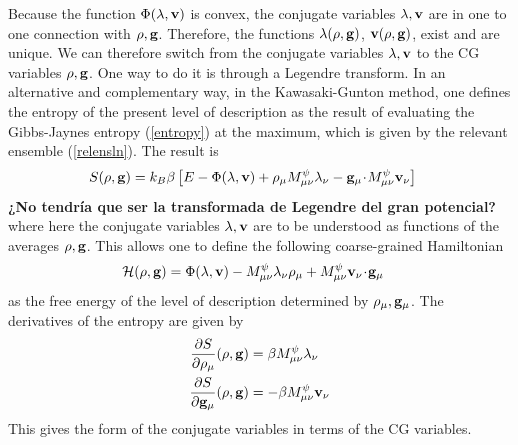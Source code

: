 \documentclass[b5paper,openright,11pt]{book}
\newcommand{\esc}{\!\cdot\!}
\newcommand{\Note}[1]{{\bf \color{red}#1}}    %
\begin{document}
\begin{appendices}
Because the function $ \Phi(\lambda,{\bf v})$ is convex, the conjugate
variables  $\lambda,{\bf  v}$  are  in  one  to  one  connection  with
$\rho,{\bf  g}$.  Therefore,  the  functions $\lambda(\rho,{\bf  g})$,
${\bf  v}(\rho,{\bf g})$,  exist  and are  unique.   We can  therefore
switch  from  the conjugate  variables  $\lambda,{\bf  v}$ to  the  CG
variables $\rho,{\bf  g}$.  One  way to  do it  is through  a Legendre
transform.   In   an  alternative   and  complementary  way,   in  the
Kawasaki-Gunton method, one  defines the entropy of  the present level
of description  as the result  of evaluating the  Gibbs-Jaynes entropy
(\ref{entropy}) at  the maximum, which  is given by  the relevant
ensemble (\ref{relensln}).  The result is
\begin{align}
  S(\rho,{\bf g}) &=k_B\beta\left[E-\Phi(\lambda,{\bf v})
+\rho_\mu M^\psi_{\mu\nu}\lambda_\nu-{\bf g}_\mu\esc M^\psi_{\mu\nu}{\bf v}_\nu\right]
\label{entropy2}
\end{align}
\Note{¿No tendría que ser la transformada de Legendre del gran potencial?}
where  here  the  conjugate  variables $\lambda,{\bf  v}$  are  to  be
understood as functions  of the averages $\rho,{\bf  g}$.  This allows one
to define  the following coarse-grained Hamiltonian
\begin{align}
  {\cal H}(\rho,{\bf g}) &=\Phi(\lambda,{\bf v})
 - M^\psi_{\mu\nu}\lambda_\nu \rho_\mu+M^\psi_{\mu\nu}{\bf v}_\nu\esc {\bf g}_\mu
\label{olegApp}
\end{align}
as  the  free  energy  of  the  level  of  description  determined  by
$\rho_\mu,{\bf g}_\mu$. The derivatives of the entropy are given by
\begin{align}
\frac{\partial S}{\partial \rho_\mu} (\rho,{\bf g}) &=\beta M^\psi_{\mu\nu}\lambda_\nu
\nonumber\\
\frac{\partial S}{\partial {\bf g}_\mu} (\rho,{\bf g}) &=- \beta M^\psi_{\mu\nu}{\bf v}_\nu
\label{derS}
\end{align}
This gives the form of the conjugate variables in terms of the CG variables.

\end{appendices}
\end{document}
